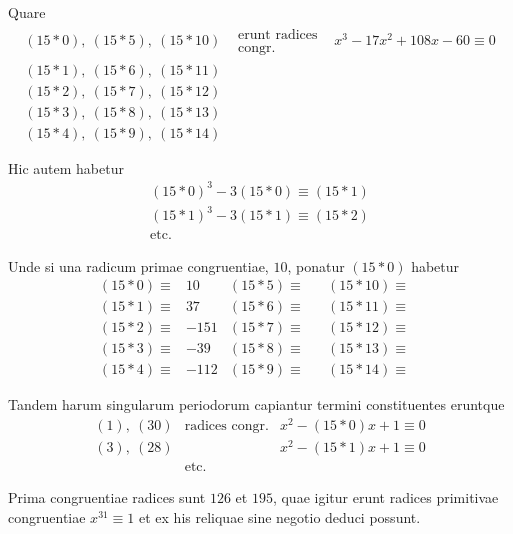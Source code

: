 Quare
\[
\begin{array}{lll}
(15\ast0),\ (15\ast5),\ (15\ast10)&\begin{gathered}\text{erunt radices}\\\text{congr.}\end{gathered}&x^3-17x^2+108x-60\equiv0\\
(15\ast1),\ (15\ast6),\ (15\ast11)&&\\
(15\ast2),\ (15\ast7),\ (15\ast12)&&\\
(15\ast3),\ (15\ast8),\ (15\ast13)&&\\
(15\ast4),\ (15\ast9),\ (15\ast14)&&
\end{array}
\]

Hic autem habetur
\[
\begin{gathered}
(15\ast0)^3-3(15\ast0)\equiv(15\ast1)\\
(15\ast1)^3-3(15\ast1)\equiv(15\ast2)\\
\text{etc.}
\end{gathered}
\]

Unde si una radicum primae congruentiae, $10$, ponatur $(15\ast0)$ habetur
\[
\begin{array}{rlrlrl}
(15\ast0)\equiv&10&(15\ast5)\equiv&& (15\ast10)\equiv&\\
(15\ast1)\equiv&37&(15\ast6)\equiv&& (15\ast11)\equiv&\\
(15\ast2)\equiv&-151&(15\ast7)\equiv&& (15\ast12)\equiv&\\
(15\ast3)\equiv&-39&(15\ast8)\equiv&& (15\ast13)\equiv&\\
(15\ast4)\equiv&-112&(15\ast9)\equiv&& (15\ast14)\equiv&
\end{array}
\]

Tandem harum singularum periodorum capiantur termini constituentes eruntque
\[
\begin{array}{lll}
(1),\ (30)&\text{radices congr.}&x^2-(15\ast0)x+1\equiv0\\
(3),\ (28)&&x^2-(15\ast1)x+1\equiv0\\
&\text{etc.}
\end{array}
\]

Prima congruentiae radices sunt $126$ et $195$, quae igitur erunt radices primitivae congruentiae $x^{31}\equiv1$ et ex his reliquae sine negotio deduci possunt.
